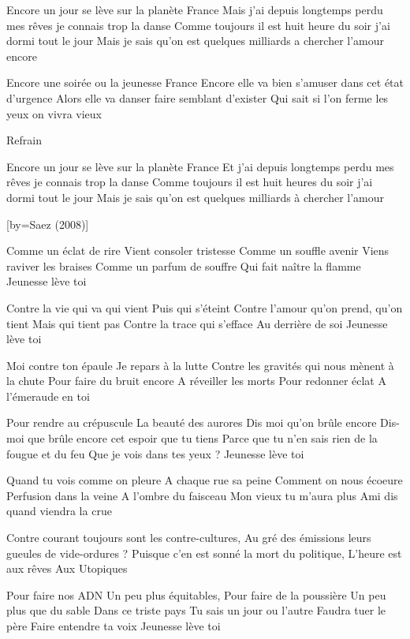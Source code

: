 \beginverse
Encore un jour se lève sur la planète France
Mais j'ai depuis longtemps perdu mes rêves je connais trop la danse
Comme toujours il est huit heure du soir j'ai dormi tout le jour
Mais je sais qu'on est quelques milliards a chercher l'amour encore
\endverse

\beginverse
Encore une soirée ou la jeunesse France
Encore elle va bien s'amuser dans cet état d'urgence
Alors elle va danser faire semblant d'exister
Qui sait si l'on ferme les yeux on vivra vieux
\endverse

\beginverse
Refrain
\endverse

\beginverse
Encore un jour se lève sur la planète France
Et j'ai depuis longtemps perdu mes rêves je connais trop la danse
Comme toujours il est huit heures du soir j'ai dormi tout le jour
Mais je sais qu'on est quelques milliards à chercher l'amour
\endverse

[by={Saez (2008)}]

\beginverse
Comme un éclat de rire
Vient consoler tristesse
Comme un souffle avenir
Viens raviver les braises
Comme un parfum de souffre
Qui fait naître la flamme
Jeunesse lève toi
\endverse

\beginverse
Contre la vie qui va qui vient
Puis qui s'éteint
Contre l'amour qu'on prend, qu'on tient
Mais qui tient pas
Contre la trace qui s'efface
Au derrière de soi
Jeunesse lève toi
\endverse

\beginverse
Moi contre ton épaule
Je repars à la lutte
Contre les gravités qui nous mènent à la chute
Pour faire du bruit encore
A réveiller les morts
Pour redonner éclat
A l'émeraude en toi
\endverse

\beginverse
Pour rendre au crépuscule
La beauté des aurores
Dis moi qu'on brûle encore
Dis-moi que brûle encore cet espoir que tu tiens
Parce que tu n'en sais rien de la fougue et du feu
Que je vois dans tes yeux ?
Jeunesse lève toi \!
\endverse

\beginverse
Quand tu vois comme on pleure
A chaque rue sa peine
Comment on nous écoeure
Perfusion dans la veine
A l'ombre du faisceau
Mon vieux tu m'aura plus \!
Ami dis quand viendra la crue
\endverse

\beginverse
Contre courant toujours sont les contre-cultures,
Au gré des émissions leurs gueules de vide-ordures ?
Puisque c'en est sonné la mort du politique,
L'heure est aux rêves
Aux Utopiques \!
\endverse

\beginverse
Pour faire nos ADN
Un peu plus équitables,
Pour faire de la poussière
Un peu plus que du sable
Dans ce triste pays
Tu sais un jour ou l'autre
Faudra tuer le père
Faire entendre ta voix
Jeunesse lève toi \!
\endverse

